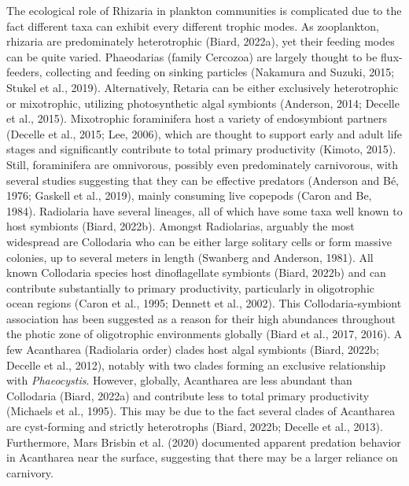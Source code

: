 \documentclass[
]{article}
\begin{document}
The ecological role of Rhizaria in plankton communities is complicated
due to the fact different taxa can exhibit every different trophic
modes. As zooplankton, rhizaria are predominately heterotrophic (Biard,
2022a), yet their feeding modes can be quite varied. Phaeodarias (family
Cercozoa) are largely thought to be flux-feeders, collecting and feeding
on sinking particles (Nakamura and Suzuki, 2015; Stukel et al., 2019).
Alternatively, Retaria can be either exclusively heterotrophic or
mixotrophic, utilizing photosynthetic algal symbionts (Anderson, 2014;
Decelle et al., 2015). Mixotrophic foraminifera host a variety of
endosymbiont partners (Decelle et al., 2015; Lee, 2006), which are
thought to support early and adult life stages and significantly
contribute to total primary productivity (Kimoto, 2015). Still,
foraminifera are omnivorous, possibly even predominately carnivorous,
with several studies suggesting that they can be effective predators
(Anderson and Bé, 1976; Gaskell et al., 2019), mainly consuming live
copepods (Caron and Be, 1984). Radiolaria have several lineages, all of
which have some taxa well known to host symbionts (Biard, 2022b).
Amongst Radiolarias, arguably the most widespread are Collodaria who can
be either large solitary cells or form massive colonies, up to several
meters in length (Swanberg and Anderson, 1981). All known Collodaria
species host dinoflagellate symbionts (Biard, 2022b) and can contribute
substantially to primary productivity, particularly in oligotrophic
ocean regions (Caron et al., 1995; Dennett et al., 2002). This
Collodaria-symbiont association has been suggested as a reason for their
high abundances throughout the photic zone of oligotrophic environments
globally (Biard et al., 2017, 2016). A few Acantharea (Radiolaria order)
clades host algal symbionts (Biard, 2022b; Decelle et al., 2012),
notably with two clades forming an exclusive relationship with
\emph{Phaeocystis}. However, globally, Acantharea are less abundant than
Collodaria (Biard, 2022a) and contribute less to total primary
productivity (Michaels et al., 1995). This may be due to the fact
several clades of Acantharea are cyst-forming and strictly heterotrophs
(Biard, 2022b; Decelle et al., 2013). Furthermore, Mars Brisbin et al.
(2020) documented apparent predation behavior in Acantharea near the
surface, suggesting that there may be a larger reliance on carnivory.
\end{document}
